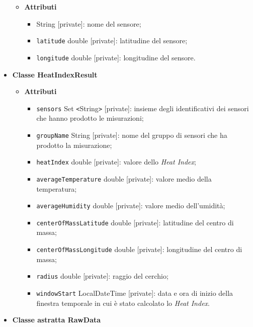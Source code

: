 \begin{itemize}
	      \begin{itemize}
		      \item \textbf{Attributi}
		            \begin{itemize}
			            \item \texttt{} String [private]: nome del sensore;
			            \item \texttt{latitude} double [private]: latitudine del sensore;
			            \item \texttt{longitude} double [private]: longitudine del sensore.
		            \end{itemize}
	      \end{itemize}
	\item \textbf{Classe HeatIndexResult}
	      \begin{itemize}
		      \item \textbf{Attributi}
		            \begin{itemize}
			            \item \texttt{sensors} Set \texttt{<}String\texttt{>} [private]: insieme degli identificativi dei sensori che hanno prodotto le misurazioni;
			            \item \texttt{groupName} String [private]: nome del gruppo di sensori che ha prodotto la misurazione;
			            \item \texttt{heatIndex} double [private]: valore dello \textit{Heat Index};
			            \item \texttt{averageTemperature} double [private]: valore medio della temperatura;
			            \item \texttt{averageHumidity} double [private]: valore medio dell'umidità;
			            \item \texttt{centerOfMassLatitude} double [private]: latitudine del centro di massa;
			            \item  \texttt{centerOfMassLongitude} double [private]: longitudine del centro di massa;
			            \item  \texttt{radius} double [private]: raggio del cerchio;
			            \item  \texttt{windowStart} LocalDateTime [private]: data e ora di inizio della finestra temporale in cui è stato calcolato lo \textit{Heat Index}.
		            \end{itemize}
	      \end{itemize}
	\item \textbf{Classe astratta RawData}\label{abstract_class_raw_data}
	      \begin{itemize}

\end{itemize}
\end{itemize}
